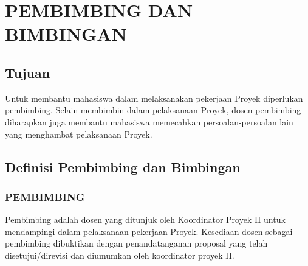 \chapter{PEMBIMBING DAN BIMBINGAN}
\section{Tujuan}
Untuk membantu	 mahasiswa	 dalam	 melaksanakan	 pekerjaan	 Proyek	 diperlukan pembimbing. Selain membimbin  dalam	 pelaksanaan	 Proyek,	 dosen	 pembimbing	diharapkan	 juga	 membantu	 mahasiswa	 memecahkan	 persoalan-persoalan	 lain	 yang menghambat	pelaksanaan	Proyek.

\section{ Definisi	Pembimbing	dan	Bimbingan	}
\subsection{PEMBIMBING}
Pembimbing	 adalah	 dosen	 yang	 ditunjuk	 oleh	 Koordinator Proyek II untuk	mendampingi	dalam	 pelaksanaan	 pekerjaan	 Proyek. Kesediaan dosen	 sebagai	 pembimbing	 dibuktikan	dengan penandatanganan	 proposal	 yang	 telah	 disetujui/direvisi	 dan	 diumumkan	 oleh	
koordinator	proyek	II.

